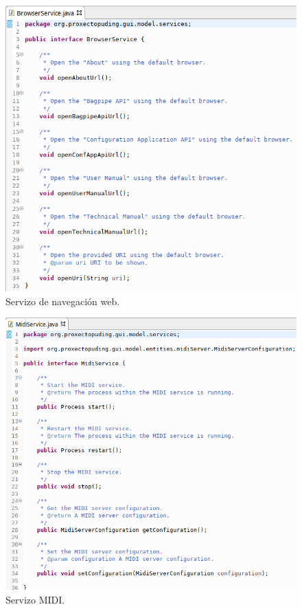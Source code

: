    \begin{figure}[htbp]
    \centering
    \includegraphics[scale=0.6, keepaspectratio=true]{./imagenes/servizo-navegacion.png}
    \caption{Servizo de navegación web.}
    \label{figura:ServizoNavegacion}
   \end{figure}
   
   \begin{figure}[htbp]
    \centering
    \includegraphics[scale=0.6, keepaspectratio=true]{./imagenes/servizo-midi.png}
    \caption{Servizo MIDI.}
    \label{figura:ServizoMidi}
   \end{figure}
   
